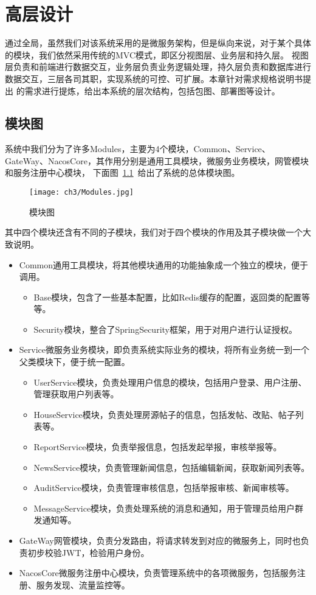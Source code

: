 \chapter{高层设计}
通过全局，虽然我们对该系统采用的是微服务架构，但是纵向来说，对于某个具体的模块，我们依然采用传统的MVC模式，即区分视图层、业务层和持久层。
视图层负责和前端进行数据交互，业务层负责业务逻辑处理，持久层负责和数据库进行数据交互，三层各司其职，实现系统的可控、可扩展。本章针对需求规格说明书提出
的需求进行提炼，给出本系统的层次结构，包括包图、部署图等设计。

\section{模块图}
系统中我们分为了许多Modules，主要为4个模块，Common、Service、GateWay、NacosCore，其作用分别是通用工具模块，微服务业务模块，网管模块和服务注册中心模块，
下面图~\ref{fig:Modules}~给出了系统的总体模块图。
\begin{figure}[htbp]
    \centering
    \texttt{[image: ch3/Modules.jpg]}
    \caption{模块图}\label{fig:Modules}
    \vspace{\baselineskip} %
\end{figure}

其中四个模块还含有不同的子模块，我们对于四个模块的作用及其子模块做一个大致说明。
\begin{itemize}
    \item Common通用工具模块，将其他模块通用的功能抽象成一个独立的模块，便于调用。
    \begin{itemize}
        \item Base模块，包含了一些基本配置，比如Redis缓存的配置，返回类的配置等等。
        \item Security模块，整合了SpringSecurity框架，用于对用户进行认证授权。
    \end{itemize}
    \item Service微服务业务模块，即负责系统实际业务的模块，将所有业务统一到一个父类模块下，便于统一配置。
    \begin{itemize}
        \item UserService模块，负责处理用户信息的模块，包括用户登录、用户注册、管理获取用户列表等。
        \item HouseService模块，负责处理房源帖子的信息，包括发帖、改贴、帖子列表等。
        \item ReportService模块，负责举报信息，包括发起举报，审核举报等。
        \item NewsService模块，负责管理新闻信息，包括编辑新闻，获取新闻列表等。
        \item AuditService模块，负责管理审核信息，包括举报审核、新闻审核等。
        \item MessageService模块，负责处理系统的消息和通知，用于管理员给用户群发通知等。
    \end{itemize}
    \item GateWay网管模块，负责分发路由，将请求转发到对应的微服务上，同时也负责初步校验JWT，检验用户身份。
    \item NacosCore微服务注册中心模块，负责管理系统中的各项微服务，包括服务注册、服务发现、流量监控等。
\end{itemize}

